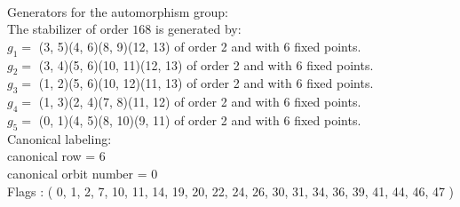 \\
Generators for the automorphism group: \\
The stabilizer of order $168$ is generated by:\\
$g_{1} = $ (3, 5)(4, 6)(8, 9)(12, 13) of order 2 and with 6 fixed points.\\
$g_{2} = $ (3, 4)(5, 6)(10, 11)(12, 13) of order 2 and with 6 fixed points.\\
$g_{3} = $ (1, 2)(5, 6)(10, 12)(11, 13) of order 2 and with 6 fixed points.\\
$g_{4} = $ (1, 3)(2, 4)(7, 8)(11, 12) of order 2 and with 6 fixed points.\\
$g_{5} = $ (0, 1)(4, 5)(8, 10)(9, 11) of order 2 and with 6 fixed points.\\

\bigskip
Canonical labeling:\\
canonical row = 6\\
canonical orbit number = 0\\
Flags : ( 0, 1, 2, 7, 10, 11, 14, 19, 20, 22, 24, 26, 30, 31, 34, 36, 39, 41, 44, 46, 47 )\\
